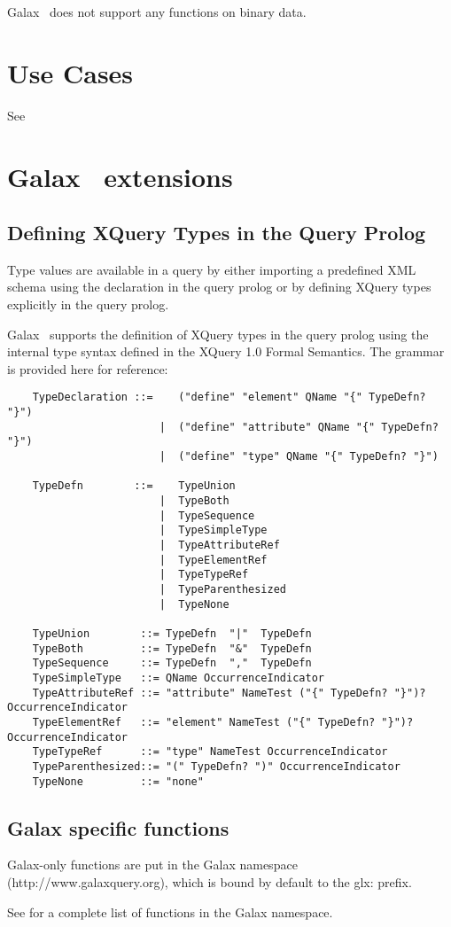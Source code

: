  Galax \version\ does not support any functions on binary data.


\section{Use Cases}

  See 

\section{Galax \version\ extensions}

\subsection{Defining XQuery Types in the Query Prolog}

    Type values are available in a query by either importing a
    predefined XML schema using the  declaration in the
    query prolog or by defining XQuery types explicitly in the query prolog.

    Galax \version\ supports the definition of XQuery types in the query
    prolog using the internal type syntax defined in the XQuery 1.0
    Formal Semantics.  The grammar is provided here for reference:

\begin{verbatim}
    TypeDeclaration ::=    ("define" "element" QName "{" TypeDefn? "}")
                        |  ("define" "attribute" QName "{" TypeDefn? "}")
                        |  ("define" "type" QName "{" TypeDefn? "}")

    TypeDefn        ::=    TypeUnion 
                        |  TypeBoth 
                        |  TypeSequence 
                        |  TypeSimpleType 
                        |  TypeAttributeRef 
                        |  TypeElementRef 
                        |  TypeTypeRef 
                        |  TypeParenthesized 
                        |  TypeNone

    TypeUnion        ::= TypeDefn  "|"  TypeDefn
    TypeBoth         ::= TypeDefn  "&"  TypeDefn
    TypeSequence     ::= TypeDefn  ","  TypeDefn
    TypeSimpleType   ::= QName OccurrenceIndicator
    TypeAttributeRef ::= "attribute" NameTest ("{" TypeDefn? "}")? OccurrenceIndicator
    TypeElementRef   ::= "element" NameTest ("{" TypeDefn? "}")? OccurrenceIndicator
    TypeTypeRef      ::= "type" NameTest OccurrenceIndicator
    TypeParenthesized::= "(" TypeDefn? ")" OccurrenceIndicator
    TypeNone         ::= "none"
\end{verbatim}

\subsection{Galax specific functions}

    Galax-only functions are put in the Galax namespace
    (http://www.galaxquery.org), which is bound by default to the
    glx: prefix.

    See  for a complete list of functions
    in the Galax namespace.



